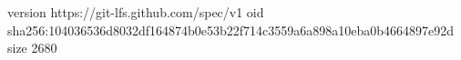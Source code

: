 version https://git-lfs.github.com/spec/v1
oid sha256:104036536d8032df164874b0e53b22f714c3559a6a898a10eba0b4664897e92d
size 2680
